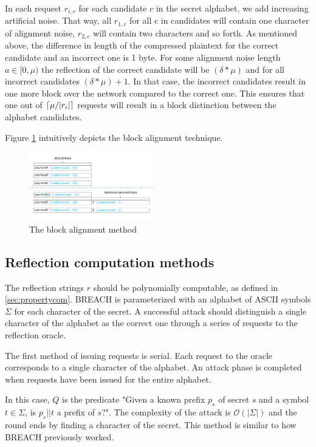 \documentclass[conference, letterpaper, 10pt]{IEEEtran}
\DeclarePairedDelimiter{\ceil}{\lceil}{\rceil}
\begin{document}
In each request $r_{i, c}$ for each candidate $c$ in the secret alphabet, we add
increasing artificial noise. That way, all $r_{1, c}$ for all c in candidates
will contain one character of alignment noise, $r_{2, c}$ will contain two
characters and so forth. As mentioned above, the difference in length of the
compressed plaintext for the correct candidate and an incorrect one is 1 byte.
For some alignment noise length $a \in [0, \mu)$ the reflection of the correct
candidate will be $(\delta*\mu)$ and for all incorrect candidates
$(\delta*\mu)+1$. In that case, the incorrect candidates result in one more
block over the network compared to the correct one.  This ensures that one out
of $\ceil{\mu / |r_i|}$ requests will result in a block distinction between the
alphabet candidates.

Figure \ref{fig:block_alignment} intuitively depicts the block alignment technique.

   \begin{figure}[thpb]
      \centering
          \includegraphics[width=0.48\textwidth]{block_alignment.png}
      \caption{The block alignment method}
      \label{fig:block_alignment}
   \end{figure}

\subsection{Reflection computation methods}\label{subsec:reflectionmethods}
The reflection strings $r$ should be polynomially computable, as defined in
\ref{sec:propertycom}. BREACH is
parameterized with an alphabet of ASCII symbols $\Sigma$
for each character of the
secret. A successful attack should distinguish a single character of the
alphabet as the correct one through a series of requests to the reflection
oracle.

The first method of issuing requests is serial. Each request to the oracle
corresponds to a single character of the alphabet. An attack phase is completed
when requests have been issued for the entire alphabet.

In this case, $Q$ is the predicate "Given a known prefix $p_s$ of secret $s$ and
a symbol $t \in \Sigma$, is $p_s || t$ a prefix of $s$?". The complexity of the attack is $\mathcal{O}(|\Sigma|)$ and
the round ends by finding a character of the secret. This method is similar to
how BREACH previously worked.
\end{document}

